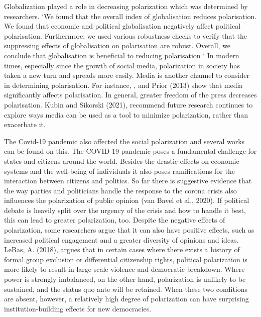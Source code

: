 \documentclass{article}
\begin{document}
Globalization played a role in decreasing polarization which was determined by researchers. ‘We found that the overall index of globalisation reduces polarisation. We found that economic and political globalisation negatively affect political polarisation. Furthermore, we used various robustness checks to verify that the suppressing effects of globalisation on polarisation are robust. Overall, we conclude that globalisation is beneficial to reducing polarisation ‘\cite{Fang2021-bh}
In modern times, especially since the growth of social media, polarization in society has taken a new turn and spreads more easily. Media is another channel to consider in determining polarisation. For instance, \cite{Bernhardt2008-wj}\cite{Melki2019-hl}, and Prior (2013)\cite{Prior2013-vz} show that media significantly affects polarisation. In general, greater freedom of the press decreases polarisation. Kubin and Sikorski (2021), recommend future research continues to explore ways media can be used as a tool to minimize polarization, rather than exacerbate it.
 
The Covid-19 pandemic also affected the social polarization and several works can be found on this. The COVID-19 pandemic poses a fundamental challenge for states and citizens around the world. Besides the drastic effects on economic systems and the well-being of individuals it also poses ramifications for the interaction between citizens and politics. So far there is suggestive evidence that the way parties and politicians handle the response to the corona crisis also influences the polarization of public opinion (van Bavel et al., 2020). If political debate is heavily split over the urgency of the crisis and how to handle it best, this can lead to greater polarization, too.
Despite the negative effects of polarization, some researchers argue that it can also have positive effects, such as increased political engagement and a greater diversity of opinions and ideas. LeBas, A. (2018)\cite{LeBas2018-hs}, argues that in certain cases where there exists a history of formal group exclusion or differential citizenship rights, political polarization is more likely to result in large-scale violence and democratic breakdown. Where power is strongly imbalanced, on the other hand, polarization is unlikely to be sustained, and the status quo ante will be retained. When these two conditions are absent, however, a relatively high degree of polarization can have surprising institution-building effects for new democracies. \\ \\ \\
\end{document}
